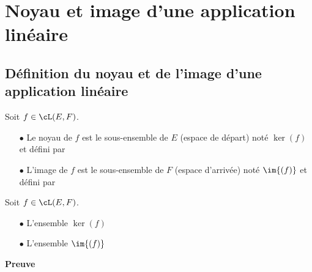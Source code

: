\documentclass[a4paper, 11pt]{article}
\begin{document}
\vspace*{0.5cm}


\section{Noyau et image d'une application lin\'eaire}
\subsection{D\'efinition du noyau et de l'image d'une application lin\'eaire}


\begin{defi}
Soit $f\in\cL(E,F)$.
\begin{itemize}
 \item[$\bullet$] Le noyau de $f$ est le sous-ensemble de $E$ (espace de d\'epart) not\'e $\ker{(f)}$ et d\'efini par\\
\vspace{1cm}

\item[$\bullet$]  L'image de $f$ est le sous-ensemble de $F$ (espace d'arriv\'ee) not\'e $\im{(f)}$ et d\'efini par\\
\vspace{1cm}

\end{itemize}
\end{defi}
 




\vspace{0.4cm}
% 


\begin{prop}
Soit $f\in\cL(E,F)$.
\begin{itemize}
\item[$\bullet$] L'ensemble $\ker{(f)}$ \dotfill %
\item[$\bullet$] L'ensemble $\im{(f)}$  \dotfill %
\end{itemize}
\end{prop}
 \textbf{Preuve}
\end{document}
